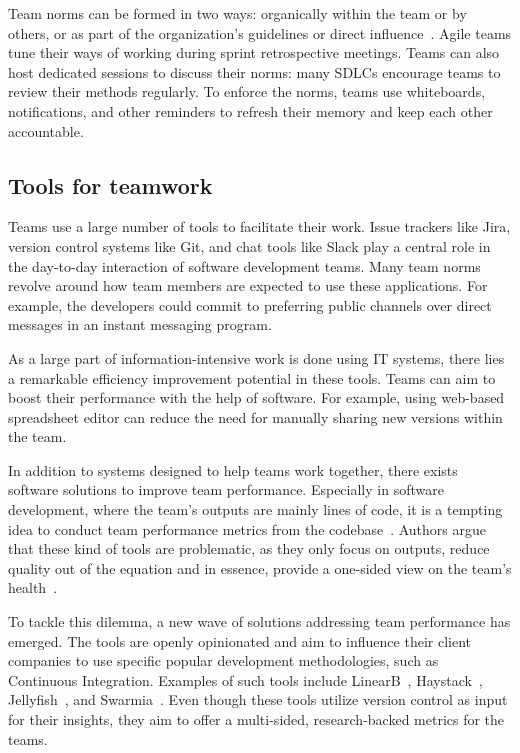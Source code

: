 Team norms can be formed in two ways: organically within the team or by others, or as part of the organization's guidelines or direct influence~\cite{teh_social_2012}. Agile teams tune their ways of working during sprint retrospective meetings. Teams can also host dedicated sessions to discuss their norms: many SDLCs encourage teams to review their methods regularly. To enforce the norms, teams use whiteboards, notifications, and other reminders to refresh their memory and keep each other accountable.  

\subsection{Tools for teamwork}

Teams use a large number of tools to facilitate their work. Issue trackers like Jira, version control systems like Git, and chat tools like Slack play a central role in the day-to-day interaction of software development teams. Many team norms revolve around how team members are expected to use these applications. For example, the developers could commit to preferring public channels over direct messages in an instant messaging program.

 As a large part of information-intensive work is done using IT systems, there lies a remarkable efficiency improvement potential in these tools. Teams can aim to boost their performance with the help of software. For example, using web-based spreadsheet editor can reduce the need for manually sharing new versions within the team.

In addition to systems designed to help teams work together, there exists software solutions to improve team performance. Especially in software development, where the team's outputs are mainly lines of code, it is a tempting idea to conduct team performance metrics from the codebase~\cite{mcintosh_empirical_2016}. Authors argue that these kind of tools are problematic, as they only focus on outputs, reduce quality out of the equation and in essence, provide a one-sided view on the team's health~\cite{forsgren_space_2021, forsgren_accelerate_2018, oliveira_code_2020}.

To tackle this dilemma, a new wave of solutions addressing team performance has emerged. The tools are openly opinionated and aim to influence their client companies to use specific popular development methodologies, such as Continuous Integration. Examples of such tools include LinearB~\cite{linearb_developer_2022}, Haystack~\cite{haystack_haystack_2022}, Jellyfish~\cite{jellyfish_align_2022}, and Swarmia~\cite{swarmia_gain_2022}. Even though these tools utilize version control as input for their insights, they aim to offer a multi-sided, research-backed metrics for the teams.


